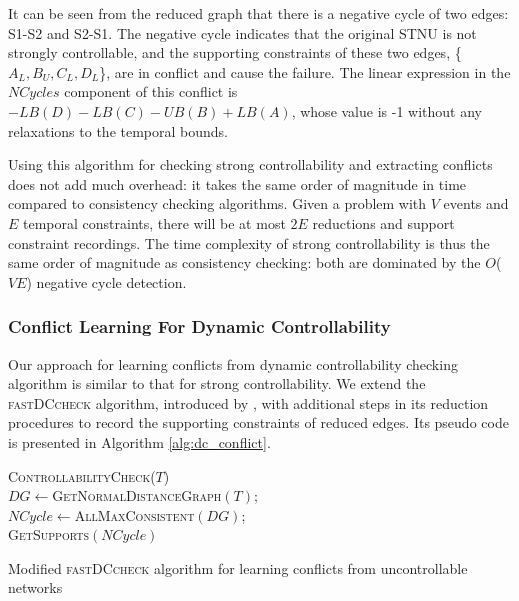 \documentclass[jair,twoside,11pt,theapa]{article}
\let\oldnl\nl%
\newcommand{\nonl}{\renewcommand{\nl}{\let\nl\oldnl}}%
\begin{document}
It can be seen from the reduced graph that there is a negative cycle of two
edges: S1-S2 and S2-S1. The negative cycle indicates that the original STNU is
not strongly controllable, and the supporting constraints of these two edges,
\{$A_L,B_U,C_L,D_L$\}, are in conflict and cause the failure. The linear
expression in the $NCycles$ component of this conflict is
$-LB(D)-LB(C)-UB(B)+LB(A)$, whose value is -1 without any relaxations to the
temporal bounds.


Using this algorithm for checking strong controllability and extracting
conflicts does not add much overhead: it takes the same order of magnitude in
time compared to consistency checking algorithms. Given a problem with $V$
events and $E$ temporal constraints, there will be at most $2E$ reductions and support
constraint recordings. The time complexity of strong controllability is thus the
same order of magnitude as consistency checking: both are dominated by the
$O$($VE$) negative cycle detection.


\subsubsection{Conflict Learning For Dynamic Controllability}

Our approach for learning conflicts from dynamic controllability checking
algorithm is similar to that for strong controllability. We extend the
\textsc{fastDCcheck} algorithm, introduced by , with additional
steps in its reduction procedures to record the supporting constraints of reduced
edges. Its pseudo code is presented in Algorithm \ref{alg:dc_conflict}.

\begin{algorithm}[ht!]
	\SetAlgoLined
	\Indm
	\Algorithm{}
	\nonl\textsc{ControllabilityCheck}($\mathit{T}$)\\
	\Indp
	$DG\leftarrow$\textsc{GetNormalDistanceGraph}$(T)$;\\
$NCycle\leftarrow$\textsc{AllMaxConsistent}$(DG)$;\\
\Return \textsc{GetSupports}$(NCycle)$\;
\caption{Modified \textsc{fastDCcheck} algorithm for learning conflicts from uncontrollable networks}
\label{alg:dc_conflict}
\end{algorithm}
\end{document}
